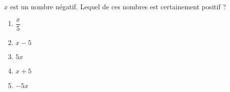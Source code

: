 $x$ est un nombre négatif. Lequel de ces nombres est certainement positif ?
\begin{multicols}{5}
  \begin{enumerate}[A/]
  \item $\dfrac{x}5$
  \item $x-5$
  \item $5x$
  \item $x+5$
  \item $-5x$
  \end{enumerate}
\end{multicols}